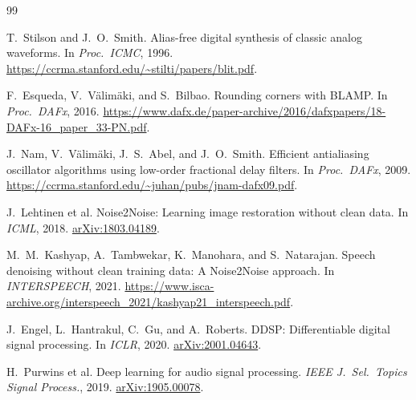 \documentclass[10pt,twocolumn,letterpaper]{article}
\theoremstyle{remark}
\begin{document}












\FloatBarrier
\raggedbottom
\balance
{\footnotesize
\setlength{\baselineskip}{11.5pt}
\begin{thebibliography}{99}
\setlength{\itemsep}{0.25ex plus 0.05ex}
\setlength{\parsep}{0pt}
\setlength{\parskip}{0pt}

T.~Stilson and J.~O.~Smith.
\newblock Alias-free digital synthesis of classic analog waveforms.
\newblock In \emph{Proc.\ ICMC}, 1996.
\newblock \url{https://ccrma.stanford.edu/~stilti/papers/blit.pdf}.

F.~Esqueda, V.~V\"alim\"aki, and S.~Bilbao.
\newblock Rounding corners with BLAMP.
\newblock In \emph{Proc.\ DAFx}, 2016.
\newblock \url{https://www.dafx.de/paper-archive/2016/dafxpapers/18-DAFx-16_paper_33-PN.pdf}.

J.~Nam, V.~V\"alim\"aki, J.~S.~Abel, and J.~O.~Smith.
\newblock Efficient antialiasing oscillator algorithms using low-order fractional delay filters.
\newblock In \emph{Proc.\ DAFx}, 2009.
\newblock \url{https://ccrma.stanford.edu/~juhan/pubs/jnam-dafx09.pdf}.

J.~Lehtinen et al.
\newblock Noise2Noise: Learning image restoration without clean data.
\newblock In \emph{ICML}, 2018.
\newblock \href{https://arxiv.org/abs/1803.04189}{arXiv:1803.04189}.

M.~M.~Kashyap, A.~Tambwekar, K.~Manohara, and S.~Natarajan.
\newblock Speech denoising without clean training data: A Noise2Noise approach.
\newblock In \emph{INTERSPEECH}, 2021.
\newblock \url{https://www.isca-archive.org/interspeech_2021/kashyap21_interspeech.pdf}.

J.~Engel, L.~Hantrakul, C.~Gu, and A.~Roberts.
\newblock DDSP: Differentiable digital signal processing.
\newblock In \emph{ICLR}, 2020.
\newblock \href{https://arxiv.org/abs/2001.04643}{arXiv:2001.04643}.

H.~Purwins et al.
\newblock Deep learning for audio signal processing.
\newblock \emph{IEEE J.\ Sel.\ Topics Signal Process.}, 2019.
\newblock \href{https://arxiv.org/abs/1905.00078}{arXiv:1905.00078}.


\end{thebibliography}}
\end{document}
